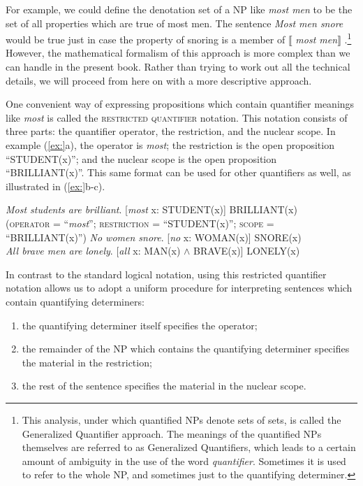 For example, we could define the denotation set of a NP like \textit{most men} to be the set of all properties which are true of most men. The sentence \textit{Most men snore} would be true just in case the property of snoring is a member of $\llbracket$ \textit{most men}$\rrbracket$ .\footnote{This analysis, under which quantified NPs denote sets of sets, is called the Generalized Quantifier approach. The meanings of the quantified NPs themselves are referred to as Generalized Quantifiers, which leads to a certain amount of ambiguity in the use of the word \textit{quantifier}. Sometimes it is used to refer to the whole NP, and sometimes just to the quantifying determiner.} However, the mathematical formalism of this approach is more complex than we can handle in the present book. Rather than trying to work out all the technical details, we will proceed from here on with a more descriptive approach.



One convenient way of expressing propositions which contain quantifier meanings like \textit{most} is called the \textsc{restricted quantifier} notation. This notation consists of three parts: the quantifier operator, the restriction, and the nuclear scope. In example (\ref{ex:}a), the operator is \textit{most}; the restriction is the open proposition “STUDENT(x)”; and the nuclear scope is the open proposition “BRILLIANT(x)”. This same format can be used for other quantifiers as well, as illustrated in (\ref{ex:}b-c).


\ea
\ea \textit{Most students are brilliant}.  [\textit{most} x: STUDENT(x)] BRILLIANT(x)\\
\textsc{(operator} = “\textit{most}”; \textsc{restriction} = “STUDENT(x)”; \textsc{scope} = “BRILLIANT(x)”)
\ex  \textit{No women snore}.  [\textit{no} x: WOMAN(x)] SNORE(x)\\
\ex \textit{All brave men are lonely}.  [\textit{all} x: MAN(x) $\wedge$ BRAVE(x)] LONELY(x)
\z \z


In contrast to the standard logical notation, using this restricted quantifier notation allows us to adopt a uniform procedure for interpreting sentences which contain quantifying determiners:


\begin{enumerate}
\item the quantifying determiner itself specifies the operator;
\item the remainder of the NP which contains the quantifying determiner specifies the material in the restriction;
\item the rest of the sentence specifies the material in the nuclear scope.
\end{enumerate}

